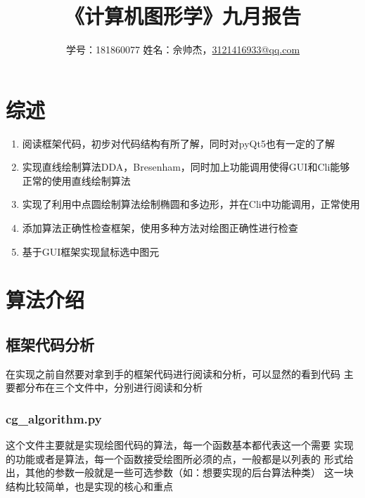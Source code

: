 \documentclass[a4paper,UTF8]{article}
\theoremstyle{definition}
\begin{document}
\title{\textbf{《计算机图形学》九月报告}}
\author{学号：181860077 姓名：佘帅杰，\href{mailto:3121416933@qq.com}{3121416933@qq.com}}
\maketitle

\section{综述}
\begin{enumerate}
    \item 阅读框架代码，初步对代码结构有所了解，同时对pyQt5也有一定的了解
    
    \item 实现直线绘制算法DDA，Bresenham，同时加上功能调用使得GUI和Cli能够
    正常的使用直线绘制算法
    
    \item 实现了利用中点圆绘制算法绘制椭圆和多边形，并在Cli中功能调用，正常使用

    \item 添加算法正确性检查框架，使用多种方法对绘图正确性进行检查
    
    \item 基于GUI框架实现鼠标选中图元
\end{enumerate}


\section{算法介绍}
\subsection{框架代码分析}
在实现之前自然要对拿到手的框架代码进行阅读和分析，可以显然的看到代码
主要都分布在三个文件中，分别进行阅读和分析
\subsubsection{cg\_algorithm.py}
这个文件主要就是实现绘图代码的算法，每一个函数基本都代表这一个需要
实现的功能或者是算法，每一个函数接受绘图所必须的点，一般都是以列表的
形式给出，其他的参数一般就是一些可选参数（如：想要实现的后台算法种类）
这一块结构比较简单，也是实现的核心和重点
\end{document}
